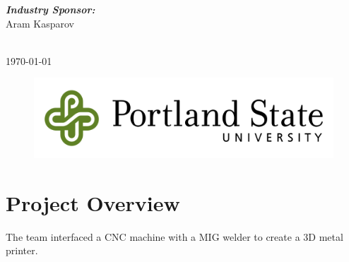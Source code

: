 \documentclass[12pt]{article}
\begin{document}
\begin{titlepage}
\begin{minipage}{0.4\textwidth}
\begin{flushright}
\emph{\textbf{Industry Sponsor:}} \\
Aram Kasparov  %
\end{flushright}
\end{minipage}\\[2cm]



{\large \today}\\[2cm] %


\begin{figure}[h]
\centering
\includegraphics[scale=0.5]{logo}
\end{figure}
 


\end{titlepage}
\clearpage

\tableofcontents
\newpage

\section{Project Overview}

The team interfaced a CNC machine with a MIG welder to create a 3D metal printer. 
\end{document}
